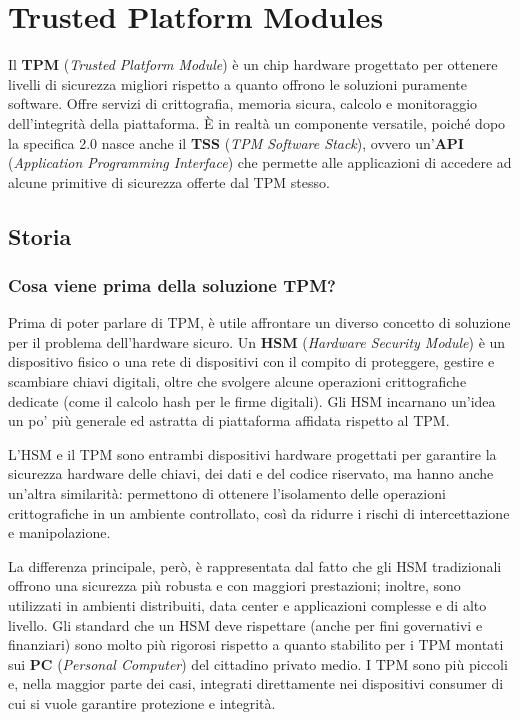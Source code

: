 \chapter{Trusted Platform Modules}\label{tpm}
Il \textbf{TPM} (\textit{Trusted Platform Module}) è un chip hardware progettato per ottenere livelli di sicurezza migliori rispetto a quanto offrono le soluzioni puramente software. Offre servizi di crittografia, memoria sicura, calcolo e monitoraggio dell’integrità della piattaforma. È in realtà un componente versatile, poiché dopo la specifica 2.0 nasce anche il \textbf{TSS} (\textit{TPM Software Stack}), ovvero un’\textbf{API} (\textit{Application Programming Interface}) che permette alle applicazioni di accedere ad alcune primitive di sicurezza offerte dal TPM stesso.

\section{Storia}

\subsection{Cosa viene prima della soluzione TPM?}
Prima di poter parlare di TPM, è utile affrontare un diverso concetto di soluzione per il problema dell’hardware sicuro. 
Un \textbf{HSM} (\textit{Hardware Security Module}) è un dispositivo fisico o una rete di dispositivi con il compito di proteggere, gestire e scambiare chiavi digitali, oltre che svolgere alcune operazioni crittografiche dedicate (come il calcolo hash per le firme digitali). Gli HSM incarnano un’idea un po’ più generale ed astratta di piattaforma affidata rispetto al TPM.

L'HSM e il TPM sono entrambi dispositivi hardware progettati per garantire la sicurezza hardware delle chiavi, dei dati e del codice riservato, ma hanno anche un'altra similarità: permettono di ottenere l’isolamento delle operazioni crittografiche in un ambiente controllato, così da ridurre i rischi di intercettazione e manipolazione. 

La differenza principale, però, è rappresentata dal fatto che gli HSM tradizionali offrono una sicurezza più robusta e con maggiori prestazioni; inoltre, sono utilizzati in ambienti distribuiti, data center e applicazioni complesse e di alto livello. Gli standard che un HSM deve rispettare (anche per fini governativi e finanziari) sono molto più rigorosi rispetto a quanto stabilito per i TPM montati sui \textbf{PC} (\textit{Personal Computer}) del cittadino privato medio.
I TPM sono più piccoli e, nella maggior parte dei casi, integrati direttamente nei dispositivi consumer di cui si vuole garantire protezione e integrità. 

